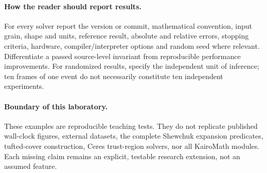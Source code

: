 \paragraph{How the reader should report results.}
For every solver report the version or commit, mathematical
convention, input grain, shape and units, reference result,
absolute and relative errors, stopping criteria, hardware,
compiler/interpreter options and random seed where relevant.
Differentiate a passed source-level invariant from reproducible
performance improvements. For randomized results, specify the
independent unit of inference; ten frames of one event do
not necessarily constitute ten independent experiments.

\paragraph{Boundary of this laboratory.}
These examples are reproducible teaching tests. They do not
replicate published wall-clock figures, external datasets,
the complete Shewchuk expansion predicates, tufted-cover
construction, Ceres trust-region solvers, nor all KairoMath
modules. Each missing claim remains an explicit, testable
research extension, not an assumed feature.
